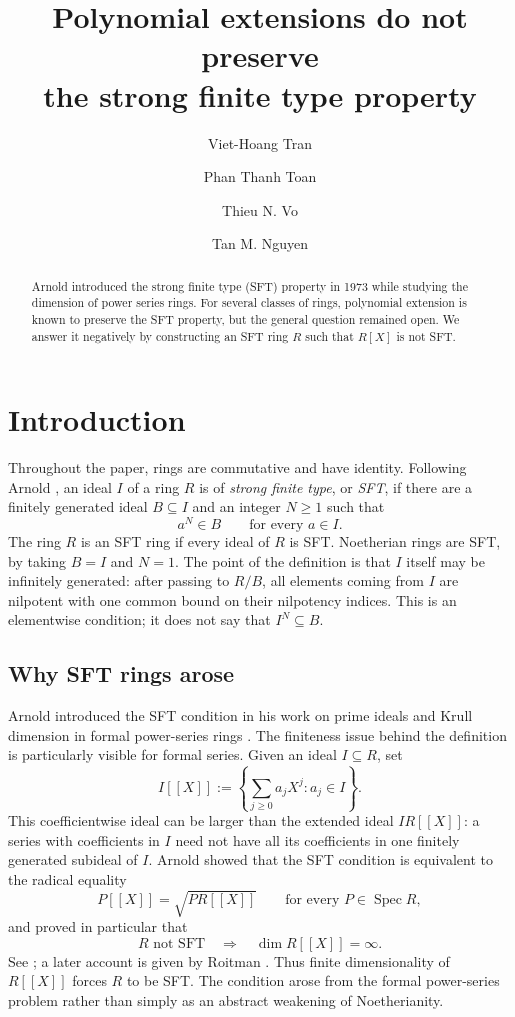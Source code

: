 \documentclass[11pt,reqno]{amsart}
\title[Polynomial extensions do not preserve the strong finite type property]
  {Polynomial extensions do not preserve \\ the strong finite type property}
\author{Viet-Hoang Tran}
\author{Phan Thanh Toan}
\author{Thieu N. Vo}
\author{Tan M. Nguyen}
\date{}
\numberwithin{equation}{section}
\theoremstyle{plain}
\theoremstyle{definition}
\theoremstyle{remark}
\newcommand{\Spec}{\operatorname{Spec}}
\begin{document}
\raggedbottom

\begin{abstract}
Arnold introduced the strong finite type (SFT) property in 1973 while studying
the dimension of power series rings.  For several classes of rings, polynomial
extension is known to preserve the SFT property, but the general question
remained open.  We answer it negatively by constructing an SFT ring $R$ such
that $R[X]$ is not SFT.
\end{abstract}

\maketitle

\section{Introduction}

Throughout the paper, rings are commutative and have identity.  Following
Arnold \cite{Arnold1973Krull}, an ideal $I$ of a ring $R$ is of
\emph{strong finite type}, or \emph{SFT}, if there are a finitely generated
ideal $B\subseteq I$ and an integer $N\geq1$ such that
\begin{equation}\label{eq:sft-definition}
  a^N\in B\qquad\text{for every }a\in I.
\end{equation}
The ring $R$ is an SFT ring if every ideal of $R$ is SFT.  Noetherian rings
are SFT, by taking $B=I$ and $N=1$.  The point of the definition is that
$I$ itself may be infinitely generated: after passing to $R/B$, all
elements coming from $I$ are nilpotent with one common bound on their
nilpotency indices.  This is an elementwise condition; it does not say that
$I^N\subseteq B$.

\subsection{Why SFT rings arose}

Arnold introduced the SFT condition in his work on prime ideals and Krull
dimension in formal power-series rings
\cite{Arnold1973Krull,Arnold1973Prufer}.  The finiteness issue behind the
definition is particularly visible for formal series.  Given an ideal
$I\subseteq R$, set
\[
 I[[X]]:=\left\{\sum_{j\geq0}a_jX^j:a_j\in I\right\}.
\]
This coefficientwise ideal can be larger than the extended ideal
$IR[[X]]$: a series with coefficients in $I$ need not have all its
coefficients in one finitely generated subideal of $I$.  Arnold showed that
the SFT condition is equivalent to the radical equality
\[
  P[[X]]=\sqrt{PR[[X]]}
  \qquad\text{for every }P\in\Spec R,
\]
and proved in particular that
\begin{equation}\label{eq:arnold}
  R\text{ not SFT}\quad\Longrightarrow\quad
  \dim R[[X]]=\infty.
\end{equation}
See \cite[Theorem~1]{Arnold1973Krull}; a later account is given by
Roitman \cite{Roitman2015}.  Thus finite dimensionality of $R[[X]]$ forces
$R$ to be SFT.  The condition arose from the formal power-series problem
rather than simply as an abstract weakening of Noetherianity.
\end{document}
